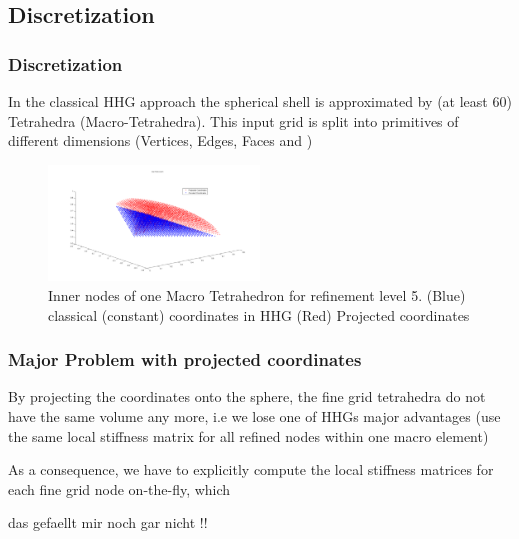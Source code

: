\documentclass[t,compress=false,usepdftitle=false]{beamer}
\begin{document}
\subsection{Discretization}
%
\begin{frame}\frametitle{Discretization}
In the classical HHG approach the spherical shell is approximated
by (at least 60) Tetrahedra (Macro-Tetrahedra).
This input grid is split into primitives of different dimensions 
(Vertices, Edges, Faces and )

\begin{figure}\centering
\includegraphics[width=0.5\textwidth]{macroTet_projected_constant_coords.png}
\caption{Inner nodes of one Macro Tetrahedron for refinement level 5. 
(Blue) classical (constant) coordinates in HHG 
(Red) Projected coordinates
}
\end{figure}



\end{frame}
%
%
\begin{frame}\frametitle{Major Problem with projected coordinates}
By projecting the coordinates onto the sphere, the fine grid tetrahedra
do not have the same volume any more, i.e we lose one of HHGs major advantages
(use the same local stiffness matrix for all refined nodes within one 
macro element)

As a consequence, we have to explicitly compute the local stiffness matrices
for each fine grid node on-the-fly, which 
   
   das gefaellt mir noch gar nicht !!



\end{frame}
%
%
\end{document}
